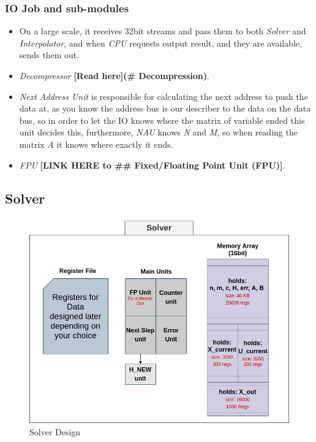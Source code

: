 \documentclass[12pt]{report}
\begin{document}
\subsubsection{IO Job and sub-modules}

\begin{itemize}
    \item On a large scale, it receives 32bit streams and pass them to both \emph{Solver} and \emph{Interpolator}, and when \emph{CPU} requests output result, and they are available, sends them out.
    \item \emph{Decompressor} \textbf{[Read here](\# Decompression)}.
    \item \emph{Next Address Unit} is responsible for calculating the next address to push the data at, as you know the address bus is our describer to the data on the data bus, so in order to let the IO knows where the matrix of variable ended this unit decides this, furthermore, \emph{NAU} knows \emph{N} and \emph{M}, so when reading the matrix \emph{A} it knows where exactly it ends.
    \item \emph{FPU} \textbf{[LINK HERE to \#\# Fixed/Floating Point Unit (FPU)]}.
\end{itemize}

\subsection{Solver}

\begin{figure}[hp]
    \centering
    \includegraphics[width=\textwidth]{solver}
    \caption{Solver Design}
    \label{fig:solver}
\end{figure}
\end{document}
